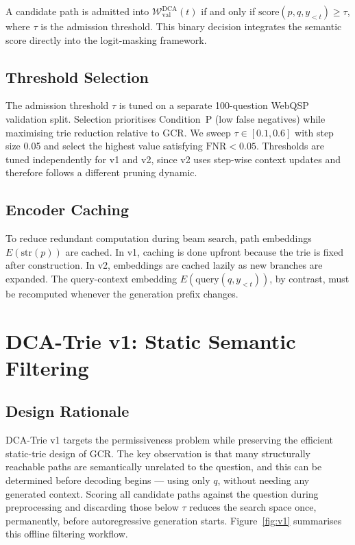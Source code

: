 A candidate path is admitted into $\mathcal{W}_{\text{val}}^{\text{DCA}}(t)$ if and only if $\text{score}(p, q, y_{<t}) \geq \tau$, where $\tau$ is the admission threshold. This binary decision integrates the semantic score directly into the logit-masking framework.

\subsection{Threshold Selection}

The admission threshold $\tau$ is tuned on a separate 100-question WebQSP validation split. Selection prioritises Condition~P (low false negatives) while maximising trie reduction relative to GCR. We sweep $\tau \in [0.1, 0.6]$ with step size 0.05 and select the highest value satisfying $\text{FNR} < 0.05$. Thresholds are tuned independently for v1 and v2, since v2 uses step-wise context updates and therefore follows a different pruning dynamic.

\subsection{Encoder Caching}

To reduce redundant computation during beam search, path embeddings $E(\text{str}(p))$ are cached. In v1, caching is done upfront because the trie is fixed after construction. In v2, embeddings are cached lazily as new branches are expanded. The query-context embedding $E(\text{query}(q, y_{<t}))$, by contrast, must be recomputed whenever the generation prefix changes.

\section{DCA-Trie v1: Static Semantic Filtering}
\label{sec:ch3v1}

\subsection{Design Rationale}

DCA-Trie v1 targets the permissiveness problem while preserving the efficient static-trie design of GCR. The key observation is that many structurally reachable paths are semantically unrelated to the question, and this can be determined before decoding begins — using only $q$, without needing any generated context. Scoring all candidate paths against the question during preprocessing and discarding those below $\tau$ reduces the search space once, permanently, before autoregressive generation starts. Figure~\ref{fig:v1} summarises this offline filtering workflow.

